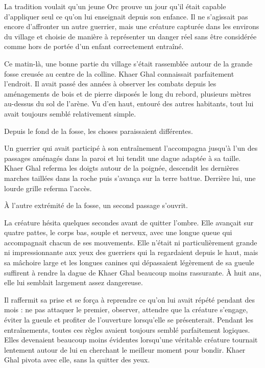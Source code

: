 La tradition voulait qu'un jeune Orc prouve un jour qu'il était capable
d'appliquer seul ce qu'on lui enseignait depuis son enfance. Il ne s'agissait
pas encore d'affronter un autre guerrier, mais une créature capturée dans les
environs du village et choisie de manière à représenter un danger réel sans
être considérée comme hors de portée d'un enfant correctement entraîné.

Ce matin-là, une bonne partie du village s'était rassemblée autour de la grande
fosse creusée au centre de la colline. Khaer Ghal connaissait parfaitement
l'endroit. Il avait passé des années à observer les combats depuis les
aménagements de bois et de pierre disposés le long du rebord, plusieurs mètres
au-dessus du sol de l'arène. Vu d'en haut, entouré des autres habitants, tout
lui avait toujours semblé relativement simple.

Depuis le fond de la fosse, les choses paraissaient différentes.

Un guerrier qui avait participé à son entraînement l'accompagna jusqu'à l'un
des passages aménagés dans la paroi et lui tendit une dague adaptée à sa taille.
Khaer Ghal referma les doigts autour de la poignée, descendit les dernières
marches taillées dans la roche puis s'avança sur la terre battue. Derrière lui,
une lourde grille referma l'accès.

À l'autre extrémité de la fosse, un second passage s'ouvrit.

La créature hésita quelques secondes avant de quitter l'ombre. Elle avançait
sur quatre pattes, le corps bas, souple et nerveux, avec une longue queue qui
accompagnait chacun de ses mouvements. Elle n'était ni particulièrement grande
ni impressionnante aux yeux des guerriers qui la regardaient depuis le haut,
mais sa mâchoire large et les longues canines qui dépassaient légèrement de sa
gueule suffirent à rendre la dague de Khaer Ghal beaucoup moins rassurante. À
huit ans, elle lui semblait largement assez dangereuse.

Il raffermit sa prise et se força à reprendre ce qu'on lui avait répété pendant
des mois : ne pas attaquer le premier, observer, attendre que la créature
s'engage, éviter la gueule et profiter de l'ouverture lorsqu'elle se
présenterait. Pendant les entraînements, toutes ces règles avaient toujours
semblé parfaitement logiques. Elles devenaient beaucoup moins évidentes
lorsqu'une véritable créature tournait lentement autour de lui en cherchant le
meilleur moment pour bondir. Khaer Ghal pivota avec elle, sans la quitter des
yeux.

